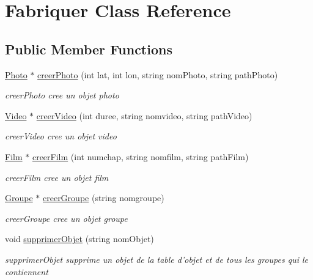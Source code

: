 \hypertarget{class_fabriquer}{\section{Fabriquer Class Reference}
\label{class_fabriquer}
}
\subsection*{Public Member Functions}
\begin{DoxyCompactItemize}
\item 
\hyperlink{class_photo}{Photo} $\ast$ \hyperlink{class_fabriquer_ac673b2ce9ab69b6597f3601b06ebc316}{creer\+Photo} (int lat, int lon, string nom\+Photo, string path\+Photo)
\begin{DoxyCompactList}\small\item\em creer\+Photo cree un objet photo \end{DoxyCompactList}\item 
\hyperlink{class_video}{Video} $\ast$ \hyperlink{class_fabriquer_a666ff437deacea7f7019bf03f469510d}{creer\+Video} (int duree, string nomvideo, string path\+Video)
\begin{DoxyCompactList}\small\item\em creer\+Video cree un objet video \end{DoxyCompactList}\item 
\hyperlink{class_film}{Film} $\ast$ \hyperlink{class_fabriquer_af50613072821d47202c3ed5893f51de0}{creer\+Film} (int numchap, string nomfilm, string path\+Film)
\begin{DoxyCompactList}\small\item\em creer\+Film cree un objet film \end{DoxyCompactList}\item 
\hyperlink{class_groupe}{Groupe} $\ast$ \hyperlink{class_fabriquer_a77b7a3bd9e845aa5c84ea55d1933b06c}{creer\+Groupe} (string nomgroupe)
\begin{DoxyCompactList}\small\item\em creer\+Groupe cree un objet groupe \end{DoxyCompactList}\item 
void \hyperlink{class_fabriquer_a348f308764daf0552ad2fe20c213ba72}{supprimer\+Objet} (string nom\+Objet)
\begin{DoxyCompactList}\small\item\em supprimer\+Objet supprime un objet de la table d'objet et de tous les groupes qui le contiennent \end{DoxyCompactList}\item 

\end{DoxyCompactItemize}
